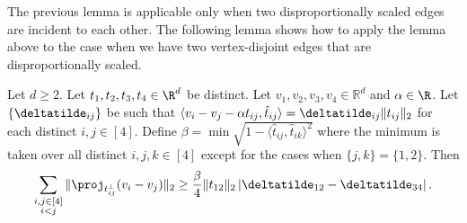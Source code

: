 The previous lemma is applicable only when two
disproportionally scaled edges are incident to each other. The following
lemma shows how to apply the lemma above to the case when we have
two vertex-disjoint edges that are disproportionally scaled.
\begin{lemma} \label{lem:rigidity2}
Let $d\ge2$. Let $t_{1},t_{2},t_{3},t_{4} \in \R^d$ be distinct.  Let $v_{1},v_{2},v_{3},v_{4}\in\mathbb{R}^{d}$ and  $\alpha \in \R$.  Let $\{\deltatilde_{ij}\}$ be such that $\langle v_{i}-v_{j}-\alpha t_{ij},\hat{t}_{ij}\rangle=\deltatilde_{ij}\|t_{ij}\|_2$
for each distinct $i,j\in[4]$. 
Define $\beta=\min\sqrt{1-\langle\hat{t}_{ij},\hat{t}_{ik}\rangle^{2}}$
where the minimum is taken over all distinct $i,j,k\in[4]$ except for the cases when $\{j,k\}=\{1,2\}$. Then
\[
	\sum_{\substack{i,j\in[4]\\i<j}} \|\proj_{t_{ij}^{\perp}}(v_{i}-v_{j})\|_2
	\ge \frac{\beta}{4}\|t_{12}\|_2\left|\deltatilde_{12}-\deltatilde_{34}\right|.
\]
\end{lemma}

